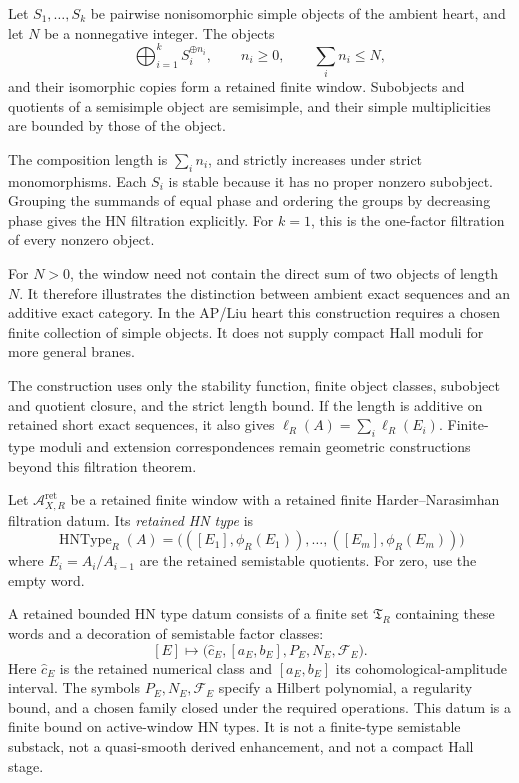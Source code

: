 \begin{example}
Let \(S_1,\ldots,S_k\) be pairwise nonisomorphic simple objects of
the ambient heart, and let \(N\) be a nonnegative integer.  The
objects
\[
\bigoplus_{i=1}^k S_i^{\oplus n_i},
\qquad n_i\ge0,\qquad \sum_i n_i\le N,
\]
and their isomorphic copies form a retained finite window.
Subobjects and quotients of a semisimple object are semisimple,
and their simple multiplicities are bounded by those of the object.

The composition length is \(\sum_i n_i\), and strictly increases
under strict monomorphisms.  Each \(S_i\) is stable because it has
no proper nonzero subobject.  Grouping the summands of equal phase
and ordering the groups by decreasing phase gives the HN
filtration explicitly.  For \(k=1\), this is the one-factor
filtration of every nonzero object.

For \(N>0\), the window need not contain the direct sum of two
objects of length \(N\).  It therefore illustrates the distinction
between ambient exact sequences and an additive exact category.
In the AP/Liu heart this construction requires a chosen finite
collection of simple objects.  It does not supply compact Hall
moduli for more general branes.
\end{example}

The construction uses only the stability function, finite object
classes, subobject and quotient closure, and the strict length
bound.  If the length is additive on retained short exact
sequences, it also gives
\(\ell_R(A)=\sum_i\ell_R(E_i)\).  Finite-type moduli and extension
correspondences remain geometric constructions beyond this
filtration theorem.

\begin{definition}
\label{def:retained-bounded-hn-type-datum}
Let \(\mathcal A_{X,R}^{\mathrm{ret}}\) be a retained finite window
with a retained finite Harder--Narasimhan filtration datum.  Its \emph{retained HN type} is
\[
\operatorname{HNType}_R(A)
=\bigl(([E_1],\phi_R(E_1)),\ldots,([E_m],\phi_R(E_m))\bigr)
\]
where \(E_i=A_i/A_{i-1}\) are the retained semistable quotients.
For zero, use the empty word.

A retained bounded HN type datum consists of a finite set
\(\mathfrak T_R\) containing these words and a decoration of
semistable factor classes:
\[
[E]\longmapsto
\bigl(\widehat c_E,[a_E,b_E],P_E,N_E,\mathcal F_E\bigr).
\]
Here \(\widehat c_E\) is the retained numerical class and
\([a_E,b_E]\) its cohomological-amplitude interval.
The symbols \(P_E,N_E,\mathcal F_E\) specify a Hilbert polynomial,
a regularity bound, and a chosen family closed under the required
operations.  This datum is a
finite bound on active-window HN types.  It is not a finite-type
semistable substack, not a quasi-smooth derived enhancement, and not a
compact Hall stage.
\end{definition}

